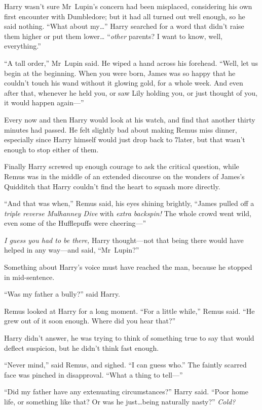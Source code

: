 Harry wasn’t sure Mr~Lupin’s concern had been misplaced, considering his own first encounter with Dumbledore; but it had all turned out well enough, so he said nothing. “What about my…” Harry searched for a word that didn’t raise them higher or put them lower… “\emph{other} parents? I want to know, well, everything.”

“A tall order,” Mr~Lupin said. He wiped a hand across his forehead. “Well, let us begin at the beginning. When you were born, James was so happy that he couldn’t touch his wand without it glowing gold, for a whole week. And even after that, whenever he held you, or saw Lily holding you, or just thought of you, it would happen again—”

\later

Every now and then Harry would look at his watch, and find that another thirty minutes had passed. He felt slightly bad about making Remus miss dinner, especially since Harry himself would just drop back to 7\pm later, but that wasn’t enough to stop either of them.

Finally Harry screwed up enough courage to ask the critical question, while Remus was in the middle of an extended discourse on the wonders of James’s Quidditch that Harry couldn’t find the heart to squash more directly.

“And that was when,” Remus said, his eyes shining brightly, “James pulled off a \emph{triple reverse Mulhanney Dive} with \emph{extra backspin!} The whole crowd went wild, even some of the Hufflepuffs were cheering—”

\emph{I guess you had to be there,} Harry thought—not that being there would have helped in any way—and said, “Mr~Lupin?”

Something about Harry’s voice must have reached the man, because he stopped in mid-sentence.

“Was my father a bully?” said Harry.

Remus looked at Harry for a long moment. “For a little while,” Remus said. “He grew out of it soon enough. Where did you hear that?”

Harry didn’t answer, he was trying to think of something true to say that would deflect suspicion, but he didn’t think fast enough.

“Never mind,” said Remus, and sighed. “I can guess who.” The faintly scarred face was pinched in disapproval. “What a thing to tell—”

“Did my father have any extenuating circumstances?” Harry said. “Poor home life, or something like that? Or was he just…being naturally nasty?” \emph{Cold?}

